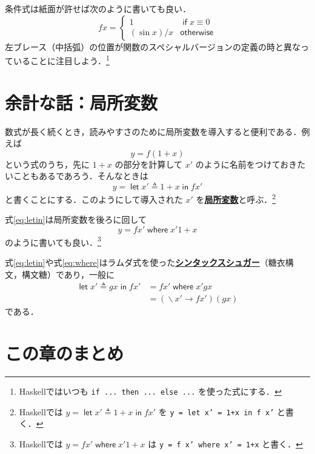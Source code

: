 \documentclass[a4paper,twocolumn]{jsbook}
\newcommand{\programminglanguage}[1]{\textsf{#1}}
\newcommand{\haskell}{\programminglanguage{Haskell}}
\newcommand{\keyword}[1]{{\underline{\textbf{#1}}}}
\newcommand{\code}[1]{\texttt{#1}}
\newcommand{\mKeyword}[1]{\mathsf{#1}} %
\newcommand{\mIfKeyword}{\mKeyword{if}}
\newcommand{\mInKeyword}{\mKeyword{in}}
\newcommand{\mLetKeyword}{\mKeyword{let}}
\newcommand{\mOtherwiseKeyword}{\mKeyword{otherwise}}
\newcommand{\mWhereKeyword}{\mKeyword{where}}
\DeclareMathOperator{\mIf}{\mIfKeyword}
\DeclareMathOperator{\mInKW}{\mInKeyword} %
\DeclareMathOperator{\mLet}{\mLetKeyword} %
\DeclareMathOperator{\mOtherwise}{\mOtherwiseKeyword}
\DeclareMathOperator{\mWhere}{\mWhereKeyword}
\DeclareMathOperator{\mLambda}{\backslash}
\DeclareMathOperator{\mLambdaArrow}{\rightarrow}
\DeclareMathOperator{\mLetEq}{\triangleq}
\newcommand{\mLambdaExp}[2]{\mLambda{#1}\mLambdaArrow{#2}}
\newcommand{\mLetIn}[3]{\mLet{#1\mLetEq#2}\mInKW{#3}}
\newcommand{\mWhere}[2]{\mathbin{\mWhereKeyword}#1\mLetEq#2}
\begin{document}
条件式は紙面が許せば次のように書いても良い．
\begin{equation}
fx=\begin{cases}
1&\mIf x\equiv0\\
(\sin x)/x&\mOtherwise
\end{cases}
\end{equation}
左ブレース（中括弧）の位置が関数のスペシャルバージョンの定義の時と異なっていることに注目しよう．\footnote{\haskell ではいつも \code{if ... then ... else ...} を使った式にする．}

\section{余計な話：局所変数}

数式が長く続くとき，読みやすさのために局所変数を導入すると便利である．例えば
\begin{equation}
y=f(1+x)
\end{equation}
という式のうち，先に $1+x$ の部分を計算して $x'$ のように名前をつけておきたいこともあるであろう．そんなときは
\begin{equation}
\label{eq:letin}
y=\mLetIn{x'}{1+x}{fx'}
\end{equation}
と書くことにする．このようにして導入された $x'$ を\keyword{局所変数}と呼ぶ．\footnote{\haskell では $y=\mLetIn{x'}{1+x}{fx'}$ を \code{y = let x' = 1+x in f x'} と書く．}

式\eqref{eq:letin}は局所変数を後ろに回して
\begin{equation}
\label{eq:where}
y=fx'\mWhere{x'}{1+x}
\end{equation}
のように書いても良い．\footnote{\haskell では $y=fx'\mWhere{x'}{1+x}$ は \code{y = f x' where x' = 1+x} と書く．}

式\eqref{eq:letin}や式\eqref{eq:where}はラムダ式を使った\keyword{シンタックスシュガー}（糖衣構文，構文糖）であり，一般に
\begin{align}
\mLetIn{x'}{gx}{fx'}
&=fx'\mWhere{x'}{gx}\\
&=(\mLambdaExp{x'}{fx'})(gx)
\end{align}
である．

\section{この章のまとめ}
\end{document}
